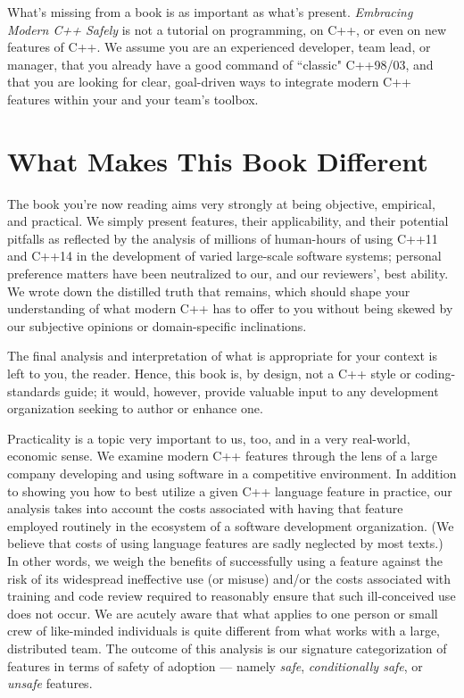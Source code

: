 What's missing from a book is as important as what's present. \textit{Embracing Modern C++ Safely} is not a tutorial on programming, on C++, or even on new features of C++. We assume you are an experienced developer, team lead, or manager, that you already have a good command of ``classic" C++98/03, and that you are looking for clear, goal-driven ways to integrate modern C++ features within your and your team's toolbox.

\section{What Makes This Book Different}

The book you're now reading aims very strongly at being objective, empirical, and practical. We simply present features, their applicability, and their potential pitfalls as reflected by the analysis of millions of human-hours of using C++11 and C++14 in the development of varied large-scale software systems; personal preference matters have been neutralized to our, and our reviewers', best ability. We wrote down the distilled truth that remains, which should shape your understanding of what modern C++ has to offer to you without being skewed by our subjective opinions or domain-specific inclinations.

The final analysis and interpretation of what is appropriate for your context is left to you, the reader. Hence, this book is, by design, not a C++ style or coding-standards guide; it would, however, provide valuable input to any development organization seeking to author or enhance one.

Practicality is a topic very important to us, too, and in a very real-world, economic sense. We examine modern C++ features through the lens of a large company developing and using software in a competitive environment. In addition to showing you how to best utilize a given C++ language feature in practice, our analysis takes into account the costs associated with having that feature employed routinely in the ecosystem of a software development organization. (We believe that costs of using language features are sadly neglected by most texts.) In other words, we weigh the benefits of successfully using a feature against the risk of its widespread ineffective use (or misuse) and/or the costs associated with training and code review required to reasonably ensure that such ill-conceived use does not occur. We are acutely aware that what applies to one person or small crew of like-minded individuals is quite different from what works with a large, distributed team. The outcome of this analysis is our signature categorization of features in terms of safety of adoption --- namely \textit{safe}, \textit{conditionally safe}, or \textit{unsafe} features.

